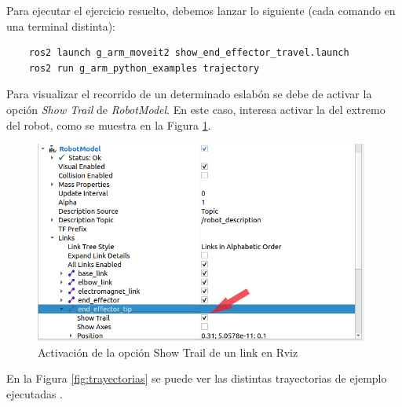 Para ejecutar el ejercicio resuelto, debemos lanzar lo siguiente (cada comando en una terminal distinta):
\begin{verbatim}
    ros2 launch g_arm_moveit2 show_end_effector_travel.launch 
    ros2 run g_arm_python_examples trajectory
\end{verbatim}

\newpage
Para visualizar el recorrido de un determinado eslabón se debe de activar la opción \textit{Show Trail} de \textit{RobotModel}. En este caso, interesa activar la 
del extremo del robot, como se muestra en la Figura \ref{fig:activarTrail}.
\begin{figure} [ht!]
    \begin{center}
        \includegraphics[width=11cm]{figs/rviz_show_trail.png}
    \end{center}
    \caption{Activación de la opción Show Trail de un link en Rviz}
\label{fig:activarTrail}
\end{figure}

En la Figura \ref{fig:trayectorias} se puede ver las distintas trayectorias de ejemplo ejecutadas .

